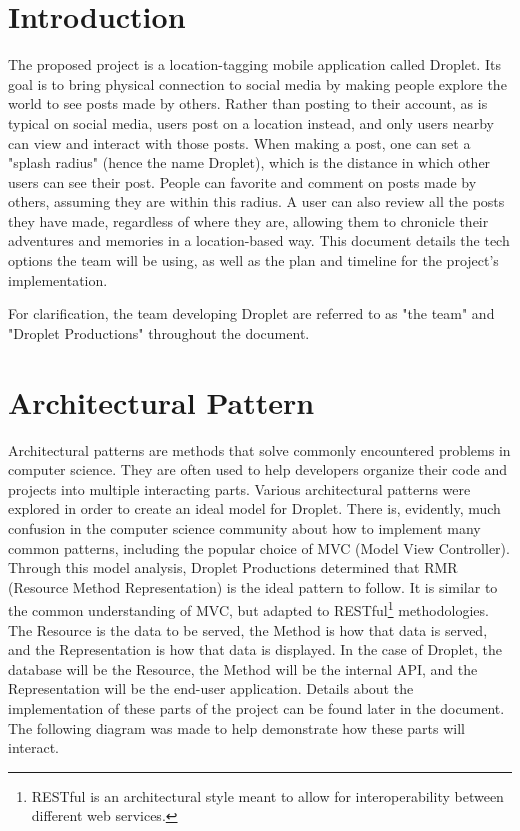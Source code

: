 \documentclass[draftclsnofoot, onecolumn, letterpaper,10pt,compsoc]{IEEEtran}
\begin{document}
\section{Introduction}
The proposed project is a location-tagging mobile application called Droplet. Its goal is to bring physical connection to social media by making people explore the world to see posts made by others. Rather than posting to their account, as is typical on social media, users post on a location instead, and only users nearby can view and interact with those posts. When making a post, one can set a "splash radius" (hence the name Droplet), which is the distance in which other users can see their post. People can favorite and comment on posts made by others, assuming they are within this radius. A user can also review all the posts they have made, regardless of where they are, allowing them to chronicle their adventures and memories in a location-based way. This document details the tech options the team will be using, as well as the plan and timeline for the project's implementation.

For clarification, the team developing Droplet are referred to as "the team" and "Droplet Productions" throughout the document. 

\newpage
\section{Architectural Pattern}

Architectural patterns are methods that solve commonly encountered problems in computer science. They are often used to help developers organize their code and projects into multiple interacting parts\cite{modelsdefined}. Various architectural patterns were explored in order to create an ideal model for Droplet. There is, evidently, much confusion in the computer science community about how to implement many common patterns, including the popular choice of MVC (Model View Controller)\cite{models}. Through this model analysis, Droplet Productions determined that RMR (Resource Method Representation) is the ideal pattern to follow. It is similar to the common understanding of MVC, but adapted to RESTful\footnote{RESTful is an architectural style meant to allow for interoperability between different web services.} methodologies. The Resource is the data to be served, the Method is how that data is served, and the Representation is how that data is displayed. In the case of Droplet, the database will be the Resource, the Method will be the internal API, and the Representation will be the end-user application. Details about the implementation of these parts of the project can be found later in the document. The following diagram was made to help demonstrate how these parts will interact. 
\end{document}
